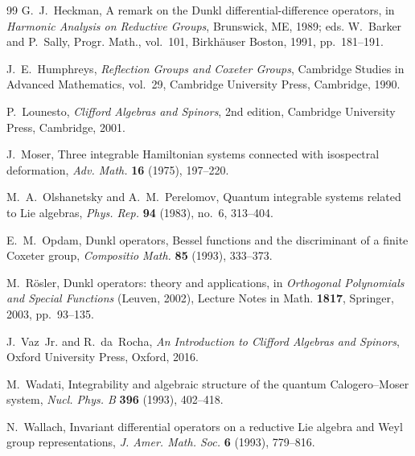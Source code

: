 \documentclass[12pt]{article}
\newcommand{\1}{\mathbbm{1}}
\theoremstyle{definition}
\begin{document}
\begin{thebibliography}{99}
G.~J.~Heckman,
\newblock A remark on the Dunkl differential-difference operators,
\newblock in \emph{Harmonic Analysis on Reductive Groups}, Brunswick, ME, 1989; eds. W.~Barker and P.~Sally,
Progr. Math., vol.~101, Birkhäuser Boston, 1991, pp.~181--191.

J.~E.~Humphreys,
\newblock \emph{Reflection Groups and Coxeter Groups},
\newblock Cambridge Studies in Advanced Mathematics, vol.~29,
Cambridge University Press, Cambridge, 1990.

P.~Lounesto,
\newblock \emph{Clifford Algebras and Spinors},
\newblock 2nd edition, Cambridge University Press, Cambridge, 2001.

J.~Moser,
\newblock Three integrable Hamiltonian systems connected with isospectral deformation,
\newblock \emph{Adv. Math.} \textbf{16} (1975), 197--220.

M.~A.~Olshanetsky and A.~M.~Perelomov,
\newblock Quantum integrable systems related to Lie algebras,
\newblock \emph{Phys. Rep.} \textbf{94} (1983), no.~6, 313--404.

E.~M.~Opdam,
\newblock Dunkl operators, Bessel functions and the discriminant of a finite Coxeter group,
\newblock \emph{Compositio Math.} \textbf{85} (1993), 333--373.

M.~Rösler,
\newblock Dunkl operators: theory and applications,
\newblock in \emph{Orthogonal Polynomials and Special Functions} (Leuven, 2002),
Lecture Notes in Math. \textbf{1817}, Springer, 2003, pp.~93--135.


J.~Vaz~Jr. and R.~da~Rocha,
\newblock \emph{An Introduction to Clifford Algebras and Spinors},
\newblock Oxford University Press, Oxford, 2016.

M.~Wadati,
\newblock Integrability and algebraic structure of the quantum Calogero--Moser system,
\newblock \emph{Nucl. Phys. B} \textbf{396} (1993), 402--418.

N.~Wallach,
\newblock Invariant differential operators on a reductive Lie algebra and Weyl group representations,
\newblock \emph{J. Amer. Math. Soc.} \textbf{6} (1993), 779--816.

\end{thebibliography}
\end{document}
